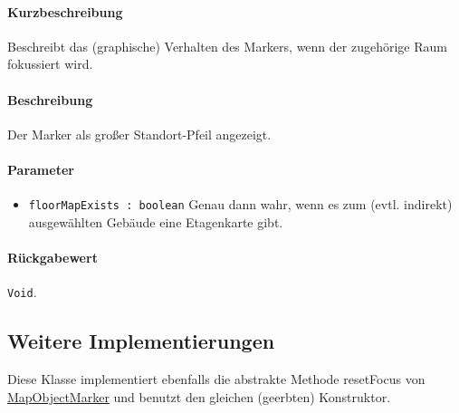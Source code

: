 \paragraph*{Kurzbeschreibung}
Beschreibt das (graphische) Verhalten des Markers, wenn der zugehörige Raum fokussiert wird.
\paragraph*{Beschreibung}
Der Marker als großer Standort-Pfeil angezeigt.
\paragraph*{Parameter}
\begin{itemize}
    \item \texttt{floorMapExists : boolean} Genau dann wahr, wenn es zum (evtl. indirekt) ausgewählten Gebäude eine Etagenkarte gibt.
\end{itemize}
\paragraph*{Rückgabewert}
\texttt{Void}.

\subsection*{Weitere Implementierungen}
Diese Klasse implementiert ebenfalls die abstrakte Methode resetFocus von \hyperref[App_Map_View_MapObjectMarker]{MapObjectMarker} 
und benutzt den gleichen (geerbten) Konstruktor.
